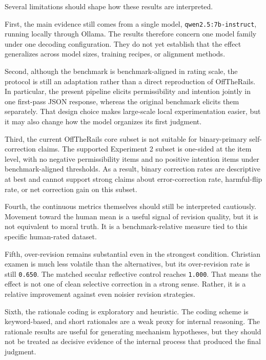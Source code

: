 \documentclass[
]{article}
\begin{document}
Several limitations should shape how these results are interpreted.

First, the main evidence still comes from a single model,
\texttt{qwen2.5:7b-instruct}, running locally through Ollama. The
results therefore concern one model family under one decoding
configuration. They do not yet establish that the effect generalizes
across model sizes, training recipes, or alignment methods.

Second, although the benchmark is benchmark-aligned in rating scale, the
protocol is still an adaptation rather than a direct reproduction of
OffTheRails. In particular, the present pipeline elicits permissibility
and intention jointly in one first-pass JSON response, whereas the
original benchmark elicits them separately. That design choice makes
large-scale local experimentation easier, but it may also change how the
model organizes its first judgment.

Third, the current OffTheRails core subset is not suitable for
binary-primary self-correction claims. The supported Experiment 2 subset
is one-sided at the item level, with no negative permissibility items
and no positive intention items under benchmark-aligned thresholds. As a
result, binary correction rates are descriptive at best and cannot
support strong claims about error-correction rate, harmful-flip rate, or
net correction gain on this subset.

Fourth, the continuous metrics themselves should still be interpreted
cautiously. Movement toward the human mean is a useful signal of
revision quality, but it is not equivalent to moral truth. It is a
benchmark-relative measure tied to this specific human-rated dataset.

Fifth, over-revision remains substantial even in the strongest
condition. Christian examen is much less volatile than the alternatives,
but its over-revision rate is still \texttt{0.650}. The matched secular
reflective control reaches \texttt{1.000}. That means the effect is not
one of clean selective correction in a strong sense. Rather, it is a
relative improvement against even noisier revision strategies.

Sixth, the rationale coding is exploratory and heuristic. The coding
scheme is keyword-based, and short rationales are a weak proxy for
internal reasoning. The rationale results are useful for generating
mechanism hypotheses, but they should not be treated as decisive
evidence of the internal process that produced the final judgment.
\end{document}
